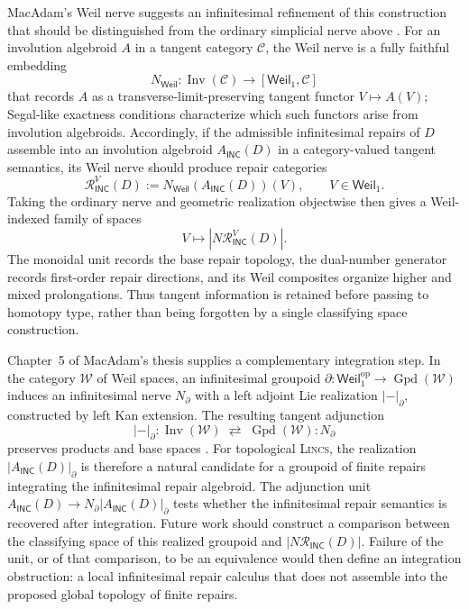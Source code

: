 \documentclass{article}
\newcommand{\C}{\mathcal{C}}
\newcommand{\INC}{\mathsf{INC}}
\begin{document}
MacAdam's Weil nerve suggests an infinitesimal refinement of this construction
that should be distinguished from the ordinary simplicial nerve above
\citep[Ch.~4]{macadam2022functorial}.  For an involution algebroid $A$ in a
tangent category $\C$, the Weil nerve is a fully faithful embedding
\[
N_{\mathsf{Weil}}:
\operatorname{Inv}(\C)\longrightarrow[\mathsf{Weil}_1,\C]
\]
that records $A$ as a transverse-limit-preserving tangent functor
$V\mapsto A(V)$; Segal-like exactness conditions characterize which such
functors arise from involution algebroids.  Accordingly, if the admissible
infinitesimal repairs of $D$ assemble into an involution algebroid
$A_{\INC}(D)$ in a category-valued tangent semantics, its Weil nerve should
produce repair categories
\[
\mathcal R_{\INC}^{V}(D)
  :=N_{\mathsf{Weil}}(A_{\INC}(D))(V),
  \qquad V\in\mathsf{Weil}_1.
\]
Taking the ordinary nerve and geometric realization objectwise then gives a
Weil-indexed family of spaces
\[
V\longmapsto\left|N\mathcal R_{\INC}^{V}(D)\right|.
\]
The monoidal unit records the base repair topology, the dual-number generator
records first-order repair directions, and its Weil composites organize
higher and mixed prolongations.  Thus tangent information is retained before
passing to homotopy type, rather than being forgotten by a single classifying
space construction.

Chapter~5 of MacAdam's thesis supplies a complementary integration step.  In
the category $\mathcal W$ of Weil spaces, an infinitesimal groupoid
$\partial:\mathsf{Weil}_1^{\mathrm{op}}\to\operatorname{Gpd}(\mathcal W)$
induces an infinitesimal nerve $N_{\partial}$ with a left adjoint Lie
realization $|-|_{\partial}$, constructed by left Kan extension.  The resulting
tangent adjunction
\[
|-|_{\partial}:
\operatorname{Inv}(\mathcal W)
\;
\rightleftarrows
\;
\operatorname{Gpd}(\mathcal W)
:N_{\partial}
\]
preserves products and base spaces
\citep[Ch.~5]{macadam2022functorial}.  For topological \textsc{Lincs}, the
realization $|A_{\INC}(D)|_{\partial}$ is therefore a natural candidate for a
groupoid of finite repairs integrating the infinitesimal repair algebroid.
The adjunction unit
$A_{\INC}(D)\to N_{\partial}|A_{\INC}(D)|_{\partial}$ tests whether the
infinitesimal repair semantics is recovered after integration.  Future work
should construct a comparison between the classifying space of this realized
groupoid and $|N\mathcal R_{\INC}(D)|$.  Failure of the unit, or of that
comparison, to be an equivalence would then define an integration obstruction:
a local infinitesimal repair calculus that does not assemble into the proposed
global topology of finite repairs.
\end{document}
